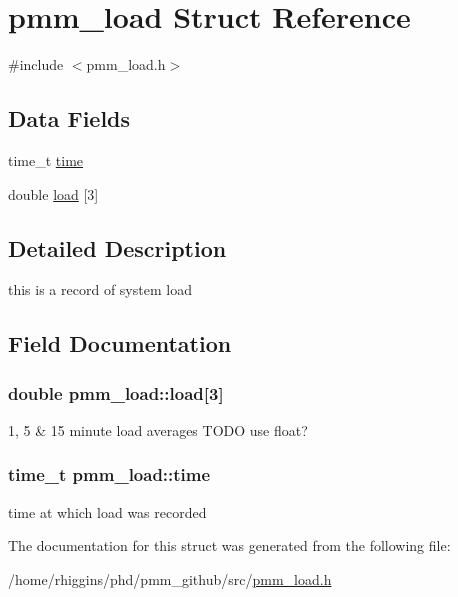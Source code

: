\hypertarget{structpmm__load}{\section{pmm\-\_\-load Struct Reference}
\label{structpmm__load}
}


{\ttfamily \#include $<$pmm\-\_\-load.\-h$>$}

\subsection*{Data Fields}
\begin{DoxyCompactItemize}
\item 
time\-\_\-t \hyperlink{structpmm__load_ae5ccbe20b22c2a13f8f40ff0e07fe99b}{time}
\item 
double \hyperlink{structpmm__load_a0478a333891fd07f97f5104ae5603bc2}{load} \mbox{[}3\mbox{]}
\end{DoxyCompactItemize}


\subsection{Detailed Description}
this is a record of system load 

\subsection{Field Documentation}
\hypertarget{structpmm__load_a0478a333891fd07f97f5104ae5603bc2}{
\subsubsection[{load}]{\setlength{\rightskip}{0pt plus 5cm}double pmm\-\_\-load\-::load\mbox{[}3\mbox{]}}}\label{structpmm__load_a0478a333891fd07f97f5104ae5603bc2}
1, 5 \& 15 minute load averages T\-O\-D\-O use float? \hypertarget{structpmm__load_ae5ccbe20b22c2a13f8f40ff0e07fe99b}{
\subsubsection[{time}]{\setlength{\rightskip}{0pt plus 5cm}time\-\_\-t pmm\-\_\-load\-::time}}\label{structpmm__load_ae5ccbe20b22c2a13f8f40ff0e07fe99b}
time at which load was recorded 

The documentation for this struct was generated from the following file\-:\begin{DoxyCompactItemize}
\item 
/home/rhiggins/phd/pmm\-\_\-github/src/\hyperlink{pmm__load_8h}{pmm\-\_\-load.\-h}\end{DoxyCompactItemize}
